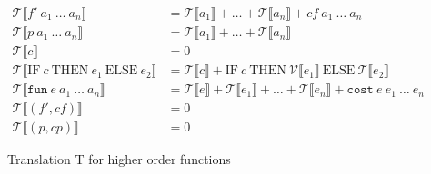 \begin{figure}
  \begin{align*}
    \mathcal{T}\llbracket f'\ a_{1}\ \dots\ a_{n}\rrbracket &= \mathcal{T}\llbracket a_{1}\rrbracket + \dots + \mathcal{T}\llbracket a_{n}\rrbracket + cf\ a_{1}\ \dots\ a_{n}\\
    \mathcal{T}\llbracket p\ a_{1}\ \dots\ a_{n}\rrbracket &= \mathcal{T}\llbracket a_{1}\rrbracket + \dots + \mathcal{T}\llbracket a_{n}\rrbracket\\
    \mathcal{T}\llbracket c \rrbracket &= 0\\
    \mathcal{T}\llbracket \text{IF}\ c\ \text{THEN}\ e_{1}\ \text{ELSE}\ e_{2}\rrbracket &= \mathcal{T}\llbracket c\rrbracket + \text{IF}\  c\ \text{THEN}\ \mathcal{V}\llbracket e_{1}\rrbracket\ \text{ELSE}\ \mathcal{T}\llbracket e_{2}\rrbracket\\
    \mathcal{T}\llbracket\texttt{fun}\ e\ a_{1}\ \dots\ a_{n}\rrbracket &= \mathcal{T}\llbracket e\rrbracket + \mathcal{T}\llbracket e_{1}\rrbracket + \dots + \mathcal{T}\llbracket e_{n}\rrbracket + \texttt{cost}\ e\ e_{1}\ \dots\ e_{n}\\
    \mathcal{T}\llbracket (f',cf)\rrbracket &= 0\\
    \mathcal{T}\llbracket (p,cp)\rrbracket &= 0
  \end{align*}
  \caption{Translation T for higher order functions}
  \label{fig:higher_T}
\end{figure}

